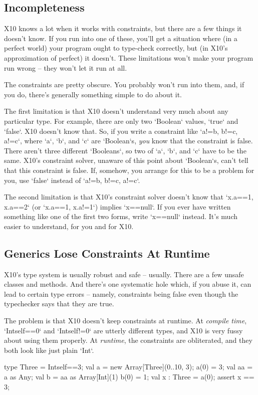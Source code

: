 \subsection{Incompleteness}

X10 knows a lot when it works with constraints, but there are a few things it
doesn't know.  If you run into one of these, you'll get a situation where (in
a perfect world) your program ought to type-check correctly, but (in X10's
approximation of perfect)  it doesn't.  These limitations won't make your
program run wrong -- they won't let it run at all.

The constraints are pretty obscure.  You probably won't run into them, and, if
you do, there's generally something simple to do about it.

The first limitation is that X10 doesn't understand very much about any
particular type.  For example, there are only two \xcd`Boolean` values,
\xcd`true` and \xcd`false`.  X10 doesn't know that.  So, if you write a
constraint like \xcd`{a!=b, b!=c, a!=c}`, where \xcd`a`, \xcd`b`, and \xcd`c`
are \xcd`Boolean`s, {\em you} know that the constraint is false.  There aren't
three different \xcd`Booleans`, so two of \xcd`a`, \xcd`b`, and \xcd`c` have
to be the same.  X10's constraint solver, unaware of this point about
\xcd`Boolean`s, can't tell that this constraint is false. 
If, somehow, you arrange for this to be a problem for you, use \xcd`false`
instead of 
\xcd`{a!=b, b!=c, a!=c}`.

The second limitation is that X10's constraint solver doesn't know that
\xcd`{x.a==1, x.a==2}` (or \xcd`{x.a==1, x.a!=1}`) implies \xcd`x==null`.
If you ever have written something like one of the first two forms, write
\xcd`x==null` instead.  It's much easier to understand, for you and for X10.


\subsection{Generics Lose Constraints At Runtime}
\label{sect:GenericsLose}

X10's type system is usually robust and safe -- usually.  There are a few
unsafe classes and methods.  And there's one systematic hole which, if you
abuse it, can lead to certain type errors -- namely, constraints being false
even though the typechecker says that they are true.

The problem is that X10 doesn't keep constraints at runtime.  
At {\em compile time}, \xcd`Int{self==0}` and \xcd`Int{self!=0}` are utterly
different types, and X10 is very fussy about using them properly.  At {\em
runtime}, the constraints are obliterated, and they both look like just plain
\xcd`Int`.  
\begin{xtennum}[]
type Three = Int{self==3};
val a = new Array[Three](0..10, 3);
a(0) = 3; 
val aa = a as Any; 
val b = aa as Array[Int](1) 
b(0) = 1; 
val x : Three = a(0); 
assert x == 3; 
\end{xtennum}

